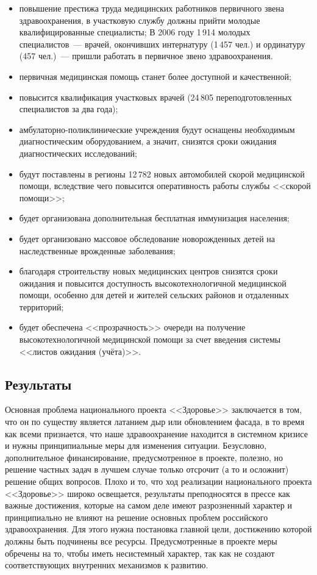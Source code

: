 \documentclass[article, 12pt, russian, oneside]{ncc}
\begin{document}
\begin{itemize}
\item повышение престижа труда медицинских работников первичного звена
  здравоохранения, в участковую службу должны прийти молодые
  квалифицированные специалисты; В 2006 году 1\,914 молодых
  специалистов~--- врачей, окончивших интернатуру (1\,457 чел.) и
  ординатуру (457 чел.)~--- пришли работать в первичное звено
  здравоохранения.
\item первичная медицинская помощь станет более доступной и
  качественной;
\item повысится квалификация участковых врачей (24\,805
  переподготовленных специалистов за два года);
\item амбулаторно-поликлинические учреждения будут оснащены
  необходимым диагностическим оборудованием, а значит, снизятся сроки
  ожидания диагностических исследований;
\item будут поставлены в регионы 12\,782 новых автомобилей скорой
  медицинской помощи, вследствие чего повысится оперативность работы
  службы <<скорой помощи>>;
\item будет организована дополнительная бесплатная иммунизация
  населения;
\item будет организовано массовое обследование новорожденных детей на
  наследственные врожденные заболевания;
\item благодаря строительству новых медицинских центров снизятся сроки
  ожидания и повысится доступность высокотехнологичной медицинской
  помощи, особенно для детей и жителей сельских районов и отдаленных
  территорий;
\item будет обеспечена <<прозрачность>> очереди на получение
  высокотехнологичной медицинской помощи за счет введения системы
  <<листов ожидания (учёта)>>.
\end{itemize}

\subsection{Результаты}

Основная проблема национального проекта <<Здоровье>> заключается в
том, что он по существу является латанием дыр или обновлением фасада,
в то время как всеми признается, что наше здравоохранение находится в
системном кризисе и нужны принципиальные меры для изменения ситуации.
Безусловно, дополнительное финансирование, предусмотренное в проекте,
полезно, но решение частных задач в лучшем случае только отсрочит (а
то и осложнит) решение общих вопросов. Плохо и то, что ход реализации
национального проекта <<Здоровье>> широко освещается, результаты
преподносятся в прессе как важные достижения, которые на самом деле
имеют разрозненный характер и принципиально не влияют на решение
основных проблем российского здравоохранения. Для этого нужна
постановка главной цели, достижению которой должны быть подчинены все
ресурсы. Предусмотренные в проекте меры обречены на то, чтобы иметь
несистемный характер, так как не создают соответствующих внутренних
механизмов к развитию.
     
\end{document}
